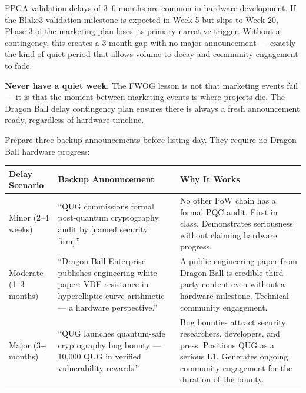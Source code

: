 \documentclass[11pt,a4paper]{article}
\begin{document}
FPGA validation delays of 3--6 months are common in hardware development. If the Blake3 validation milestone is expected in Week 5 but slips to Week 20, Phase 3 of the marketing plan loses its primary narrative trigger. Without a contingency, this creates a 3-month gap with no major announcement — exactly the kind of quiet period that allows volume to decay and community engagement to fade.

\begin{tcolorbox}[redbox]
\textbf{Never have a quiet week.} The FWOG lesson is not that marketing events fail — it is that the moment between marketing events is where projects die. The Dragon Ball delay contingency plan ensures there is always a fresh announcement ready, regardless of hardware timeline.
\end{tcolorbox}

Prepare three backup announcements before listing day. They require no Dragon Ball hardware progress:

\begin{center}
\begin{tabular}{L{2.2cm} L{5.2cm} L{5.5cm}}
  \toprule
  \textbf{Delay Scenario} & \textbf{Backup Announcement} & \textbf{Why It Works} \\
  \midrule
  Minor (2--4 weeks) &
    ``QUG commissions formal post-quantum cryptography audit by [named security firm].'' &
    No other PoW chain has a formal PQC audit. First in class. Demonstrates seriousness without claiming hardware progress. \\

  \midrule
  Moderate (1--3 months) &
    ``Dragon Ball Enterprise publishes engineering white paper: VDF resistance in hyperelliptic curve arithmetic — a hardware perspective.'' &
    A public engineering paper from Dragon Ball is credible third-party content even without a hardware milestone. Technical community engagement. \\

  \midrule
  Major (3+ months) &
    ``QUG launches quantum-safe cryptography bug bounty — 10,000 QUG in verified vulnerability rewards.'' &
    Bug bounties attract security researchers, developers, and press. Positions QUG as a serious L1. Generates ongoing community engagement for the duration of the bounty. \\

  \bottomrule
\end{tabular}
\end{center}
\end{document}
